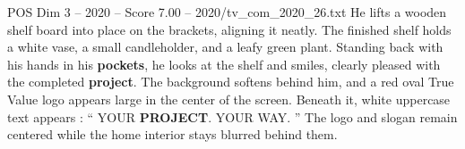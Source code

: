 \begin{textsample}{POS Dim 3 – 2020 – Score 7.00 – 2020/tv\_com\_2020\_26.txt}
He lifts a wooden shelf board into place on the brackets, aligning it neatly.
The finished shelf holds a white vase, a small candleholder, and a leafy green plant.
Standing back with his hands in his \textbf{pockets}, he looks at the shelf and smiles, clearly pleased with the completed \textbf{project}.
The background softens behind him, and a red oval True Value logo appears large in the center of the screen.
Beneath it, white uppercase text appears : “ YOUR \textbf{PROJECT}.
YOUR WAY. ” The logo and slogan remain centered while the home interior stays blurred behind them.

\end{textsample}

